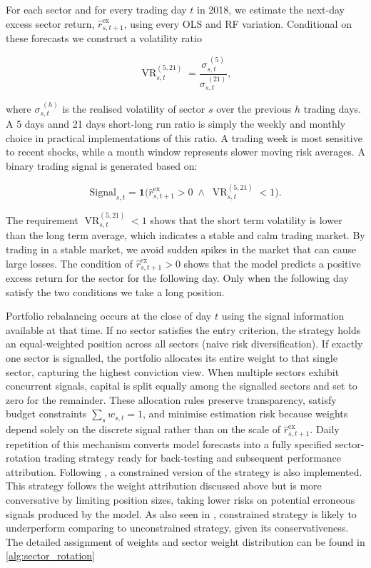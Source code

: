 For each sector and for every trading day $t$ in 2018, we estimate the next-day excess sector return, $\widehat{r}^{\text{ex}}_{s,t+1}$, using every OLS and RF variation. Conditional on these forecasts we construct a volatility ratio

\begin{equation}
\operatorname{VR}_{s,t}^{(5,21)}=\frac{\sigma_{s,t}^{\;(5)}}{\sigma_{s,t}^{\;(21)}},
\end{equation}

where $\sigma_{s,t}^{\;(h)}$ is the realised volatility of sector $s$ over the previous $h$ trading days. A 5 days annd 21 days short-long run ratio is simply the weekly and monthly choice in practical implementations of this ratio. A trading week is most sensitive to recent shocks, while a month window represents slower moving risk averages. A binary trading signal is generated based on:

\begin{equation}
\text{Signal}_{s,t}=\mathbf{1}
\!\bigl(
\widehat{r}^{\text{ex}}_{s,t+1}>0
\;\wedge\;
\operatorname{VR}_{s,t}^{(5,21)}<1
\bigr).
\end{equation}

The requirement $\operatorname{VR}_{s,t}^{(5,21)}<1$ shows that the short term volatility is lower than the long term average, which indicates a stable and calm trading market. By trading in a stable market, we avoid sudden spikes in the market that can cause large losses. The condition of $\widehat{r}^{\text{ex}}_{s,t+1}>0$ shows that the model predicts a positive excess return for the sector for the following day. Only when the following day satisfy the two conditions we take a long position.


Portfolio rebalancing occurs at the close of day $t$ using the signal information available at that time.  If no sector satisfies the entry criterion, the strategy holds an equal-weighted position across all sectors (naive risk diversification).  If exactly one sector is signalled, the portfolio allocates its entire weight to that single sector, capturing the highest conviction view.  When multiple sectors exhibit concurrent signals, capital is split equally among the signalled sectors and set to zero for the remainder. These allocation rules preserve transparency, satisfy budget constraints $\sum_{s}w_{s,t}=1$, and minimise estimation risk because weights depend solely on the discrete signal rather than on the scale of $\widehat{r}^{\text{ex}}_{s,t+1}$.  Daily repetition of this mechanism converts model forecasts into a fully specified sector-rotation trading strategy ready for back-testing and subsequent performance attribution. Following , a constrained version of the strategy is also implemented. This strategy follows the weight attribution discussed above but is more conversative by limiting position sizes, taking lower risks on potential erroneous signals produced by the model. As also seen in , constrained strategy is likely to underperform comparing to unconstrained strategy, given its conservativeness. The detailed assignment of weights and sector weight distribution can be found in \cref{alg:sector_rotation}

